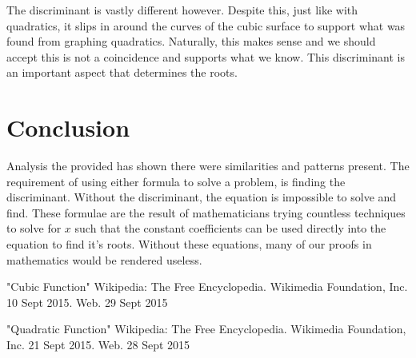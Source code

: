 \documentclass[14pt]{extarticle}
\begin{document}
The discriminant is vastly different however. Despite this, just like with quadratics, it slips in around the curves of the cubic surface to support what was found from graphing quadratics. Naturally, this makes sense and we should accept this is not a coincidence and supports what we know. This discriminant is an important aspect that determines the roots.

\section{Conclusion}
Analysis the provided has shown there were similarities and patterns present. The requirement of using either formula to solve a problem, is finding the discriminant. Without the discriminant, the equation is impossible to solve and find. These formulae are the result of mathematicians trying countless techniques to solve for $x$ such that the constant coefficients can be used directly into the equation to find it's roots. Without these equations, many of our proofs in mathematics would be rendered useless.



\newpage

\begin{thebibliography}{99}

"Cubic Function" Wikipedia: The Free Encyclopedia. Wikimedia Foundation, Inc. 10 Sept 2015. Web. 29 Sept 2015

"Quadratic Function" Wikipedia: The Free Encyclopedia. Wikimedia Foundation, Inc. 21 Sept 2015. Web. 28 Sept 2015

\end{thebibliography}
\end{document}
